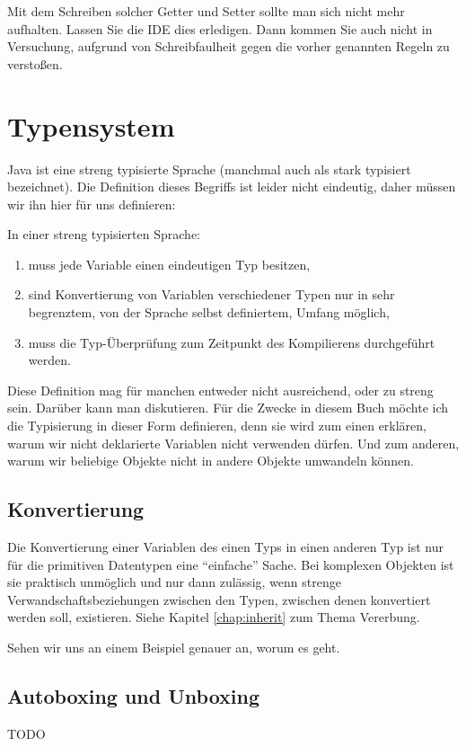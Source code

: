 Mit dem Schreiben solcher Getter und Setter sollte man sich nicht mehr aufhalten. Lassen Sie die IDE dies erledigen. Dann kommen Sie auch nicht in Versuchung, aufgrund von Schreibfaulheit gegen die vorher genannten Regeln zu verstoßen.


\section{Typensystem}

Java ist eine streng typisierte Sprache (manchmal auch als stark typisiert bezeichnet). Die Definition dieses Begriffs ist leider nicht eindeutig, daher müssen wir ihn hier für uns definieren:

In einer streng typisierten Sprache:
\begin{enumerate}
\item muss jede Variable ei\-nen eindeutigen Typ besitzen,
\item sind Konvertierung von Variablen verschiedener Typen nur in sehr begrenztem, von der Sprache selbst definiertem, Umfang möglich,
\item muss die Typ-Überprüfung zum Zeitpunkt des Kompilierens durchgeführt werden.
\end{enumerate}

Diese Definition mag für manchen entweder nicht ausreichend, oder zu streng sein. Darüber kann man diskutieren. Für die Zwecke in diesem Buch möchte ich die Typisierung in dieser Form definieren, denn sie wird zum einen erklären, warum wir nicht deklarierte Variablen nicht verwenden dürfen. Und zum anderen, warum wir beliebige Objekte nicht in andere Objekte umwandeln können.

\subsection{Konvertierung}\label{ref:conversion}
Die Konvertierung einer Variablen des einen Typs in einen anderen Typ ist nur für die primitiven Datentypen eine "`einfache"' Sache. Bei komplexen Objekten ist sie praktisch unmöglich und nur dann zulässig, wenn strenge Verwandschaftsbeziehungen zwischen den Typen, zwischen denen konvertiert werden soll, existieren. Siehe Kapitel \ref{chap:inherit} zum Thema Vererbung.

Sehen wir uns an einem Beispiel genauer an, worum es geht. 


\subsection{Autoboxing und Unboxing}\label{ref:autoboxing}
TODO


